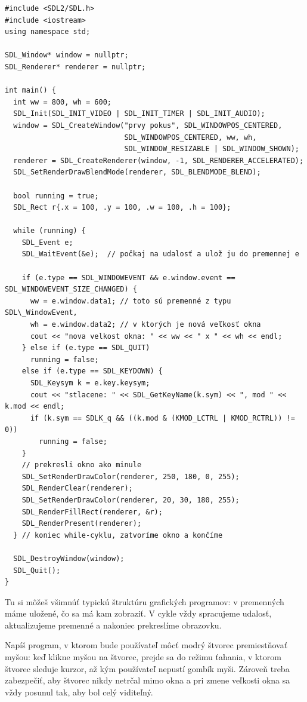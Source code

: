 \begin{lstlisting}
#include <SDL2/SDL.h>
#include <iostream>
using namespace std;

SDL_Window* window = nullptr;
SDL_Renderer* renderer = nullptr;

int main() {
  int ww = 800, wh = 600;
  SDL_Init(SDL_INIT_VIDEO | SDL_INIT_TIMER | SDL_INIT_AUDIO);
  window = SDL_CreateWindow("prvy pokus", SDL_WINDOWPOS_CENTERED,
                            SDL_WINDOWPOS_CENTERED, ww, wh,
                            SDL_WINDOW_RESIZABLE | SDL_WINDOW_SHOWN);
  renderer = SDL_CreateRenderer(window, -1, SDL_RENDERER_ACCELERATED);
  SDL_SetRenderDrawBlendMode(renderer, SDL_BLENDMODE_BLEND);

  bool running = true;
  SDL_Rect r{.x = 100, .y = 100, .w = 100, .h = 100};

  while (running) {
    SDL_Event e;
    SDL_WaitEvent(&e);  // počkaj na udalosť a ulož ju do premennej e

    if (e.type == SDL_WINDOWEVENT && e.window.event == SDL_WINDOWEVENT_SIZE_CHANGED) {
      ww = e.window.data1; // toto sú premenné z typu SDL\_WindowEvent,
      wh = e.window.data2; // v ktorých je nová veľkosť okna 
      cout << "nova velkost okna: " << ww << " x " << wh << endl;
    } else if (e.type == SDL_QUIT)
      running = false;
    else if (e.type == SDL_KEYDOWN) {
      SDL_Keysym k = e.key.keysym;
      cout << "stlacene: " << SDL_GetKeyName(k.sym) << ", mod " << k.mod << endl;
      if (k.sym == SDLK_q && ((k.mod & (KMOD_LCTRL | KMOD_RCTRL)) != 0))
        running = false;
    }
    // prekresli okno ako minule
    SDL_SetRenderDrawColor(renderer, 250, 180, 0, 255);
    SDL_RenderClear(renderer);
    SDL_SetRenderDrawColor(renderer, 20, 30, 180, 255);
    SDL_RenderFillRect(renderer, &r);
    SDL_RenderPresent(renderer);
  } // koniec while-cyklu, zatvoríme okno a končíme

  SDL_DestroyWindow(window);
  SDL_Quit();
}
\end{lstlisting}

Tu si môžeš všimnúť typickú štruktúru grafických programov: v premenných máme uložené,
čo sa má kam zobraziť. V cykle vždy spracujeme udalosť, aktualizujeme premenné
a nakoniec prekreslíme obrazovku.

\begin{uloha}
  \label{uloha:SDL.stvorec1}
  Napíš program, v ktorom bude používateľ môcť modrý štvorec premiestňovať myšou:
  keď klikne myšou na štvorec, prejde sa do režimu ťahania, v ktorom štvorec 
  sleduje kurzor, až kým používateľ nepustí gombík myši. Zároveň treba zabezpečiť, aby
  štvorec nikdy netrčal mimo okna a pri zmene veľkosti okna sa vždy posunul tak, aby bol celý 
  viditeľný.
\end{uloha}

